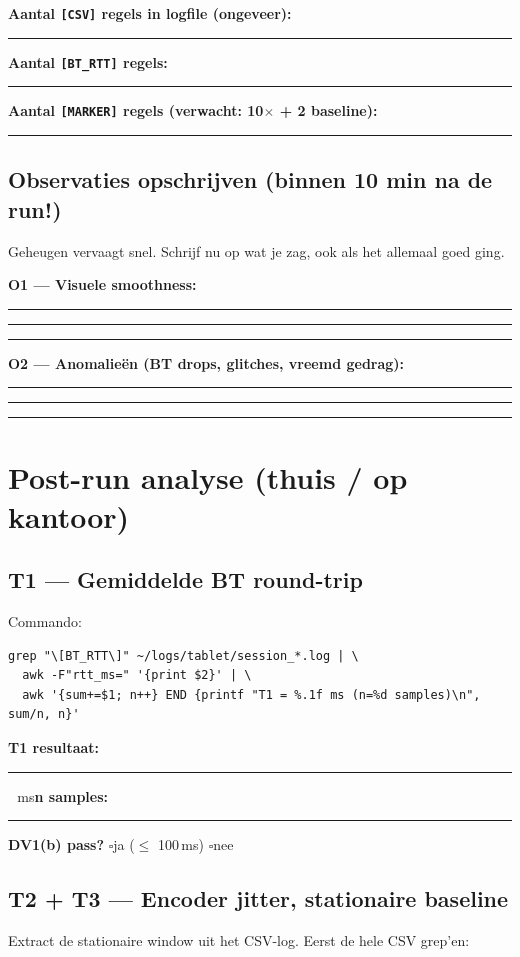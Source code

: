 \documentclass[11pt, a4paper]{article}
\newcommand{\cbox}{$\square$\;}
\newcommand{\fillshort}{\rule[-0.5ex]{2cm}{0.4pt}}
\newcommand{\fillblock}[1]{\rule[-0.5ex]{#1}{0.4pt}}
\begin{document}
\textbf{Aantal \texttt{[CSV]} regels in logfile (ongeveer):} \fillshort

\textbf{Aantal \texttt{[BT\_RTT]} regels:} \fillshort

\textbf{Aantal \texttt{[MARKER]} regels (verwacht: 10$\times$ + 2 baseline):} \fillshort

\subsection{Observaties opschrijven (binnen 10 min na de run!)}

Geheugen vervaagt snel. Schrijf nu op wat je zag, ook als het allemaal goed ging.

\textbf{O1 — Visuele smoothness:}

\fillblock{\textwidth}\hfill\fillblock{\textwidth}\hfill\fillblock{\textwidth}

\textbf{O2 — Anomalieën (BT drops, glitches, vreemd gedrag):}

\fillblock{\textwidth}\hfill\fillblock{\textwidth}\hfill\fillblock{\textwidth}

\newpage
\section{Post-run analyse (thuis / op kantoor)}

\subsection{T1 — Gemiddelde BT round-trip}

Commando:
\begin{lstlisting}
grep "\[BT_RTT\]" ~/logs/tablet/session_*.log | \
  awk -F"rtt_ms=" '{print $2}' | \
  awk '{sum+=$1; n++} END {printf "T1 = %.1f ms (n=%d samples)\n", sum/n, n}'
\end{lstlisting}

\textbf{T1 resultaat:} \fillshort\ \,ms\hfill\textbf{n samples:} \fillshort

\textbf{DV1(b) pass?} \cbox ja ($\leq$ 100\,ms)\hspace{1em} \cbox nee

\subsection{T2 + T3 — Encoder jitter, stationaire baseline}

Extract de stationaire window uit het CSV-log. Eerst de hele CSV grep'en:
\end{document}
